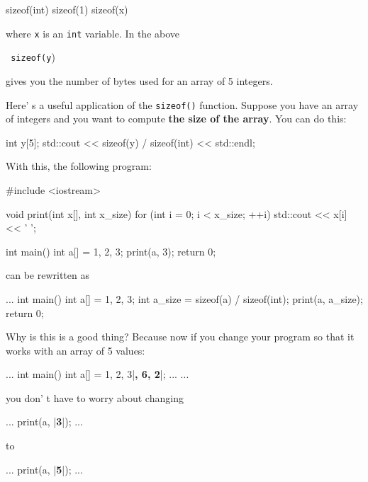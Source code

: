 sizeof(int) sizeof(1) sizeof(x)

where \texttt{x} is an \texttt{int} variable. In the above

\texttt{ sizeof(y})

gives you the number of bytes used for an array of 5 integers.

Here' s a useful application of the \texttt{sizeof()}
function. Suppose you have an array of integers and you want to compute
\textbf{the size of the array}. You can do this:

\begin{consolethree}[escapeinside=||]
int y[5];
std::cout << sizeof(y) / sizeof(int) << std::endl;
\end{consolethree}

With this, the following program:

\begin{consolethree}[escapeinside=||]
\#include \textless iostream>

void print(int x[], int x_size)
{
    for (int i = 0; i < x_size; ++i)
    {
        std::cout << x[i] << ' ';
    }
}

int main()
{
    int a[] = {1, 2, 3};
    print(a, 3);
    return 0;
}
\end{consolethree}

can be rewritten as

\begin{consolethree}[escapeinside=||]
...
int main()
{
    int a[] = {1, 2, 3};
    int a_size = sizeof(a) / sizeof(int);
    print(a, a_size);
    return 0;
}
\end{consolethree}

Why is this is a good thing? Because now if you change your program so that it works with an array of 5 values:

\begin{consolethree}[escapeinside=||]
...
int main()
{
    int a[] = {1, 2, 3|\textbf{, 6, 2}|};
    ...
}
...
\end{consolethree}

you don' t have to worry about changing

\begin{consolethree}[escapeinside=||]
...
print(a, |\textbf{3}|);
...
\end{consolethree}

to

\begin{consolethree}[escapeinside=||]
...
print(a, |\textbf{5}|);
...
\end{consolethree}

